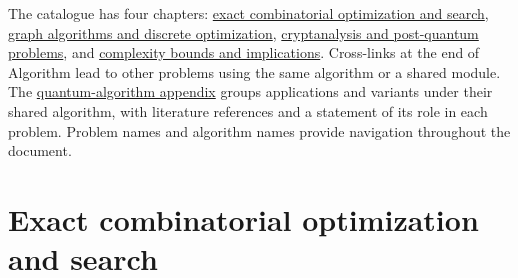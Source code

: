\documentclass[11pt,a4paper]{article}
\theoremstyle{problemstyle}
\newcommand{\subhead}[1]{\Needspace{4\baselineskip}\par\vspace{5pt}{\bfseries #1\par}\vspace{1pt}}
\begin{document}
\subhead{Reading paths}
The catalogue has four chapters: \hyperref[chapter:exact]{exact combinatorial optimization and search}, \hyperref[chapter:graphs]{graph algorithms and discrete optimization}, \hyperref[chapter:crypto]{cryptanalysis and post-quantum problems}, and \hyperref[chapter:complexity]{complexity bounds and implications}. Cross-links at the end of Algorithm lead to other problems using the same algorithm or a shared module. The \hyperref[appendix:algorithms]{quantum-algorithm appendix} groups applications and variants under their shared algorithm, with literature references and a statement of its role in each problem. Problem names and algorithm names provide navigation throughout the document.
\clearpage
\tableofcontents
\clearpage


\clearpage
\section{Exact combinatorial optimization and search}
\label{chapter:exact}
\end{document}

